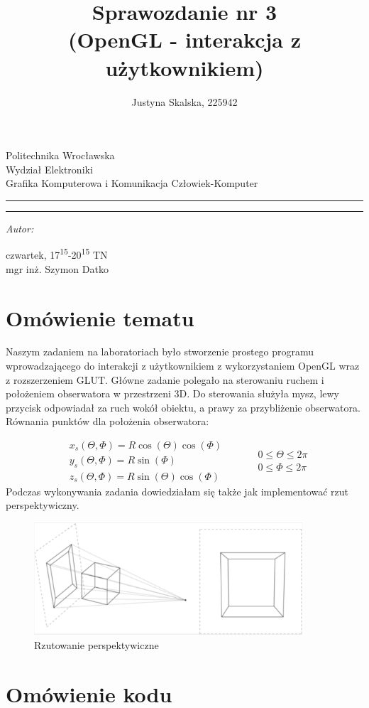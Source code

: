 \documentclass[12pt,a4paper,titlepage]{article}
\author{Justyna Skalska, 225942}
\title{Sprawozdanie nr 3\\
(OpenGL - interakcja z użytkownikiem)}
\makeatletter
\newcommand{\linia}{\rule{\linewidth}{0.4mm}}
\renewcommand{\maketitle}{\begin{titlepage}
    \vspace*{1cm}
    \begin{center}\small
    Politechnika Wrocławska\\
    Wydział Elektroniki\\
    Grafika Komputerowa i Komunikacja Człowiek-Komputer
    \end{center}
    \vspace{3cm}
    \noindent\linia
    \begin{center}
      \LARGE \textsc{\@title}
         \end{center}
     \linia
    \vspace{0.5cm}
    \begin{flushright}
    \begin{minipage}{7cm}
    \textit{\small Autor:}\\
    \normalsize \textsc{\@author} \par
    \end{minipage}
    \vspace{5cm}

     {\small czwartek, 17\textsuperscript{15}-20\textsuperscript{15} TN}\\
        mgr inż. Szymon Datko
     \end{flushright}
    \vspace*{\stretch{6}}
    \begin{center}
    \@date
    \end{center}
  \end{titlepage}%
}
\makeatother
\begin{document}
\maketitle
\section{Omówienie tematu}
Naszym zadaniem na laboratoriach było stworzenie prostego programu wprowadzającego do interakcji z użytkownikiem z wykorzystaniem OpenGL wraz z rozszerzeniem GLUT. Główne zadanie polegało na sterowaniu ruchem  i położeniem obserwatora w przestrzeni 3D. Do sterowania służyła mysz, lewy przycisk odpowiadał za ruch wokół obiektu, a prawy za przybliżenie obserwatora. Równania punktów dla położenia obserwatora:

\begin{equation}
    \begin{split}
    & x_{s}(\Theta, \Phi) = R\cos{(\Theta)}\cos{(\Phi)} \\
    & y_{s}(\Theta, \Phi) = R\sin{(\Phi)} \\
    & z_{s}(\Theta, \Phi) = R\sin{(\Theta)}\cos{(\Phi)}
    \end{split}
    \quad\quad
    \begin{split}
        & 0 \le \Theta \le 2\pi \\
        & 0 \le \Phi   \le 2\pi
    \end{split}
\end{equation}
\newline\newline
Podczas wykonywania zadania dowiedziałam się także jak implementować rzut perspektywiczny.

\begin{figure}[H]
\centering
\includegraphics[width = 10cm]{images/perspektywa.png}
\caption{Rzutowanie perspektywiczne}
\label{fig:perspektywa}
\end{figure}

\section{Omówienie kodu}
\end{document}
